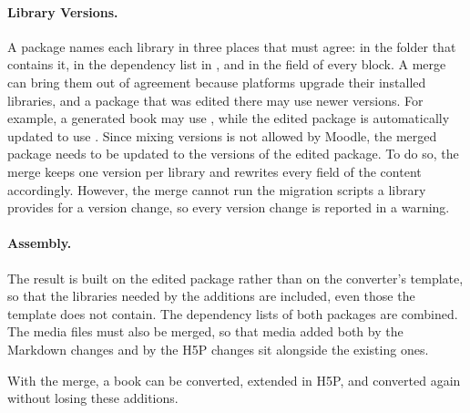 \paragraph{Library Versions.}
A package names each library in three places that must agree: in the folder that contains it, in
the dependency list in , and in the  field of every block.
A merge can bring them out of agreement because platforms upgrade their installed libraries, and a
package that was edited there may use newer versions.
For example, a generated book may use , while the edited package is automatically updated to use
.
Since mixing versions is not allowed by Moodle, the merged package needs to be updated to the versions of the edited package.
To do so, the merge keeps one version per library and rewrites every  field of the content accordingly.
However, the merge cannot run the migration scripts a library provides for a version change, so every version
change is reported in a warning.

\paragraph{Assembly.}
The result is built on the edited package rather than on the converter's template, so that the libraries
needed by the additions are included, even those the template does not contain.
The dependency lists of both packages are combined.
The media files must also be merged, so that media added both by the Markdown changes and
by the H5P changes sit alongside the existing ones.

With the merge, a book can be converted, extended in H5P, and converted again without losing these
additions.
